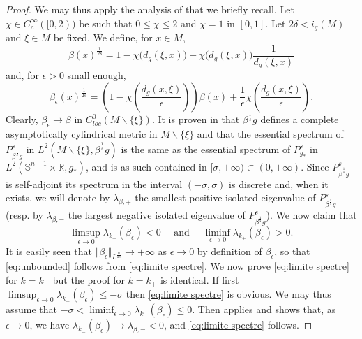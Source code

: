 \documentclass[10pt]{amsart}
\numberwithin{equation}{section}
\newcommand{\R}{\mathbb{R}}
\def\ep{{\varepsilon}}
\def \ep{\epsilon}
\theoremstyle{plain}
\theoremstyle{remark}
\begin{document}
\begin{proof}
We may thus apply the analysis of \cite{AmmannJammes} that we briefly recall. Let $\chi \in C^\infty_c( [0,2) )$ be such that $0\leq \chi \leq 2$ and $\chi = 1$ in $[0,1]$. Let $2 \delta < i_g(M)$ and $\xi \in M$ be fixed. We define, for $x \in M$,
$$ \beta(x)^{\frac{1}{2s}} = 1- \chi \big(d_g(\xi,x) \big) + \chi \big( d_g(\xi,x)\big) \frac{1}{d_g(\xi,x)} $$
and, for $\epsilon >0$ small enough,
$$ \beta_\ep(x)^{\frac{1}{2s}} = \left(1-\chi\left(\frac{d_g(x,\xi)}{\ep}\right)\right)\beta(x) + \frac{1}{\epsilon} \chi\left(\frac{d_g(x,\xi)}{\ep}\right). $$%
Clearly, $\beta_\ep \to \beta$ in $C^0_{loc}(M \backslash \{\xi\})$. It is proven in \cite[Section 3]{AmmannJammes} that $\beta^{\frac{1}{s}}g$ defines a complete asymptotically cylindrical metric in $M \backslash \{\xi\}$ and that the essential spectrum of $P_{\beta^{\frac{1}{s}}g}^s$ in $L^2(M \backslash \{\xi\}, \beta^{\frac{1}{s}}g)$ is the same as the essential spectrum of $P_{g_*}^s$ in $L^2(\mathbb{S}^{n-1} \times \R, g_*)$, and is as such contained in $[\sigma, +\infty) \subset (0, + \infty)$. Since $P_{\beta^{\frac{1}{s}}g}^s$ is self-adjoint its spectrum in the interval $(-\sigma, \sigma)$ is discrete and, when it exists,  we will denote by $\lambda_{\beta,+}$ the smallest positive isolated eigenvalue of $P_{\beta^{\frac{1}{s}}g}^s$ (resp. by $\lambda_{\beta,-}$ the largest negative isolated eigenvalue of $P_{\beta^{\frac{1}{s}}g}^s$). We now claim that
\begin{equation} \label{eq:limite spectre}
 \limsup_{\ep \to 0} \lambda_{k_-}(\beta_\ep) < 0 \quad \text{ and } \quad  \liminf_{\ep \to 0} \lambda_{k_+}(\beta_\ep)>0. 
\end{equation}
It is easily seen that $\Vert \beta_\ep \Vert_{L^{\frac{n}{2s}}} \to + \infty$ as $\ep \to 0$ by definition of $\beta_\ep$, so that \eqref{eq:unbounded} follows from \eqref{eq:limite spectre}. We now prove \eqref{eq:limite spectre} for $k=k_-$ but the proof for $k=k_+$ is identical. If first  $  \limsup_{\ep \to 0} \lambda_{k_-}(\beta_\ep)  \le - \sigma$ then \eqref{eq:limite spectre} is obvious. We may thus assume that $ - \sigma < \liminf_{\ep \to 0} \lambda_{k_-}(\beta_\ep)  \le 0$. Then \cite[Theorem 4.1]{AmmannJammes} applies and shows that, as $\ep \to 0$, we have $\lambda_{k_-}(\beta_\ep) \to \lambda_{\beta,-} < 0$, and \eqref{eq:limite spectre} follows. 

\end{proof}
\end{document}
